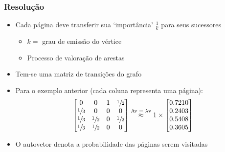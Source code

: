 \documentclass{beamer}
\begin{document}
\begin{frame}
    \frametitle{Resolução}
    \begin{itemize}
        \item Cada página deve transferir sua `importância' $\frac{1}{k}$ para
        seus sucessores
        \begin{itemize}
            \item $k =$ grau de emissão do vértice
            \item Processo de valoração de arestas
        \end{itemize}
        \item Tem-se uma matriz de transições do grafo
        \item Para o exemplo anterior (cada coluna representa uma página):
        \begin{equation*}
            \begin{bmatrix}
                0 & 0 & 1 & \sfrac{1}{2} \\
                \sfrac{1}{3} & 0 & 0 & 0 \\
                \sfrac{1}{3} & \sfrac{1}{2} & 0 & \sfrac{1}{2} \\
                \sfrac{1}{3} & \sfrac{1}{2} & 0 & 0
            \end{bmatrix} \stackrel{\text{Av = $\lambda$v}}{\approx}
            1 \times \begin{bmatrix}
                0.7210 \\ 0.2403 \\ 0.5408 \\ 0.3605
            \end{bmatrix}
        \end{equation*}
        \item O autovetor denota a probabilidade das páginas serem visitadas
    \end{itemize}
\end{frame}
\end{document}
